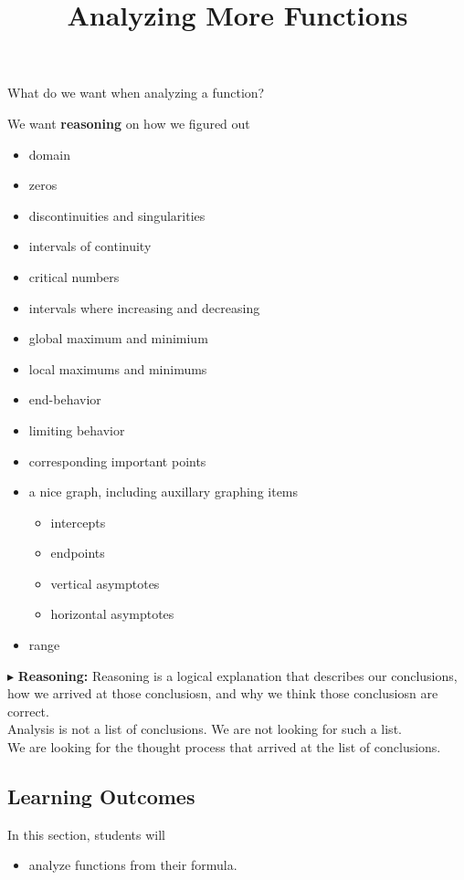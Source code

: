 \documentclass{ximera}
\title{Analyzing More Functions}
\begin{document}
\begin{abstract}
%
\end{abstract}
\maketitle








What do we want when analyzing a function?


We want \textbf{\textcolor{red!80!black}{reasoning}} on how we figured out

\begin{itemize}
\item domain
\item zeros 
\item discontinuities and singularities
\item intervals of continuity
\item critical numbers
\item intervals where increasing and decreasing
\item global maximum and minimium
\item local maximums and minimums
\item end-behavior
\item limiting behavior
\item corresponding important points
\item a nice graph, including auxillary graphing items
\begin{itemize}
	\item intercepts
	\item endpoints
	\item vertical asymptotes
	\item horizontal asymptotes
\end{itemize}
\item range
\end{itemize}



$\blacktriangleright$ \textbf{\textcolor{red!80!black}{Reasoning:}} Reasoning is a logical explanation that describes our conclusions, how we arrived at those conclusiosn, and why we think those conclusiosn are correct. \\

Analysis is not a list of conclusions. We are not looking for such a list. \\

We are looking for the thought process that arrived at the list of conclusions. \\










\subsection{Learning Outcomes}



\begin{sectionOutcomes}
In this section, students will 

\begin{itemize}
\item analyze functions from their formula.
\end{itemize}
\end{sectionOutcomes}
\end{document}
